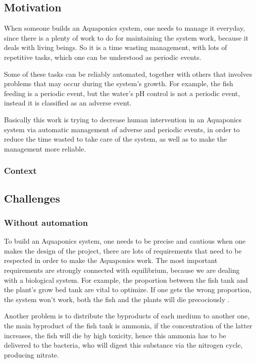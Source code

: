 \subsection{Motivation}
When someone builds an Aquaponics system,
one needs to manage it everyday,
since there is a plenty of work to do for maintaining the system work,
because it deals with living beings.
So it is a time wasting management,
with lots of repetitive tasks,
which one can be understood as periodic events.

Some of these tasks can be reliably automated,
together with others that involves problems that may occur during the system's growth.
For example, the fish feeding is a periodic event,
but the water's pH control is not a periodic event,
instead it is classified as an adverse event.

Basically this work is trying to decrease human intervention in an Aquaponics system via automatic management of adverse and periodic events,
in order to reduce the time wasted to take care of the system, 
as well as to make the management more reliable.

\subsubsection{Context}

\subsection{Challenges}

\subsubsection{Without automation}
To build an Aquaponics system,
one needs to be precise and cautious when one makes the design of the project,
there are lots of requirements that need to be respected in order to make the Aquaponics work.
The most important requirements are strongly connected with equilibrium,
because we are dealing with a biological system.
For example,
the proportion between the fish tank and the plant's grow bed tank are vital to optimize.
If one gets the wrong proportion,
the system won't work,
both the fish and the plants will die precociously \cite{Leatherbury2014}.

Another problem is to distribute the byproducts of each medium to another one,
the main byproduct of the fish tank is ammonia,
if the concentration of the latter increases,
the fish will die by high toxicity,
hence this ammonia has to be delivered to the bacteria,
who will digest this substance via the nitrogen cycle,
producing nitrate.


